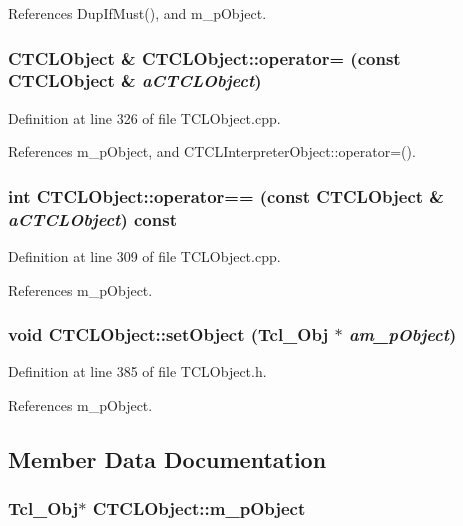 References Dup\-If\-Must(), and m\_\-p\-Object.
\subsubsection{\setlength{\rightskip}{0pt plus 5cm}CTCLObject \& CTCLObject::operator= (const CTCLObject \& {\em a\-CTCLObject})}\label{classCTCLObject_a4}




Definition at line 326 of file TCLObject.cpp.

References m\_\-p\-Object, and CTCLInterpreter\-Object::operator=().
\subsubsection{\setlength{\rightskip}{0pt plus 5cm}int CTCLObject::operator== (const CTCLObject \& {\em a\-CTCLObject}) const}\label{classCTCLObject_a5}




Definition at line 309 of file TCLObject.cpp.

References m\_\-p\-Object.
\subsubsection{\setlength{\rightskip}{0pt plus 5cm}void CTCLObject::set\-Object (Tcl\_\-Obj $\ast$ {\em am\_\-p\-Object})\hspace{0.3cm}{\tt  [inline, protected]}}\label{classCTCLObject_b0}




Definition at line 385 of file TCLObject.h.

References m\_\-p\-Object.

\subsection{Member Data Documentation}
\subsubsection{\setlength{\rightskip}{0pt plus 5cm}Tcl\_\-Obj$\ast$ CTCLObject::m\_\-p\-Object\hspace{0.3cm}{\tt  [private]}}\label{classCTCLObject_o0}




